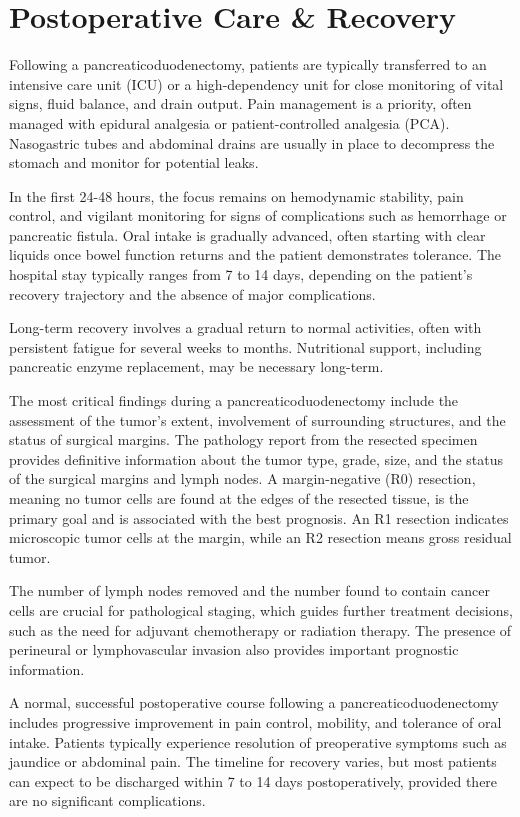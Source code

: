 \section*{Postoperative Care \& Recovery}
Following a pancreaticoduodenectomy, patients are typically transferred to an intensive care unit (ICU) or a high-dependency unit for close monitoring of vital signs, fluid balance, and drain output. Pain management is a priority, often managed with epidural analgesia or patient-controlled analgesia (PCA). Nasogastric tubes and abdominal drains are usually in place to decompress the stomach and monitor for potential leaks.

In the first 24-48 hours, the focus remains on hemodynamic stability, pain control, and vigilant monitoring for signs of complications such as hemorrhage or pancreatic fistula. Oral intake is gradually advanced, often starting with clear liquids once bowel function returns and the patient demonstrates tolerance. The hospital stay typically ranges from 7 to 14 days, depending on the patient's recovery trajectory and the absence of major complications.

Long-term recovery involves a gradual return to normal activities, often with persistent fatigue for several weeks to months. Nutritional support, including pancreatic enzyme replacement, may be necessary long-term.

The most critical findings during a pancreaticoduodenectomy include the assessment of the tumor's extent, involvement of surrounding structures, and the status of surgical margins. The pathology report from the resected specimen provides definitive information about the tumor type, grade, size, and the status of the surgical margins and lymph nodes. A margin-negative (R0) resection, meaning no tumor cells are found at the edges of the resected tissue, is the primary goal and is associated with the best prognosis. An R1 resection indicates microscopic tumor cells at the margin, while an R2 resection means gross residual tumor.

The number of lymph nodes removed and the number found to contain cancer cells are crucial for pathological staging, which guides further treatment decisions, such as the need for adjuvant chemotherapy or radiation therapy. The presence of perineural or lymphovascular invasion also provides important prognostic information.

A normal, successful postoperative course following a pancreaticoduodenectomy includes progressive improvement in pain control, mobility, and tolerance of oral intake. Patients typically experience resolution of preoperative symptoms such as jaundice or abdominal pain. The timeline for recovery varies, but most patients can expect to be discharged within 7 to 14 days postoperatively, provided there are no significant complications.

